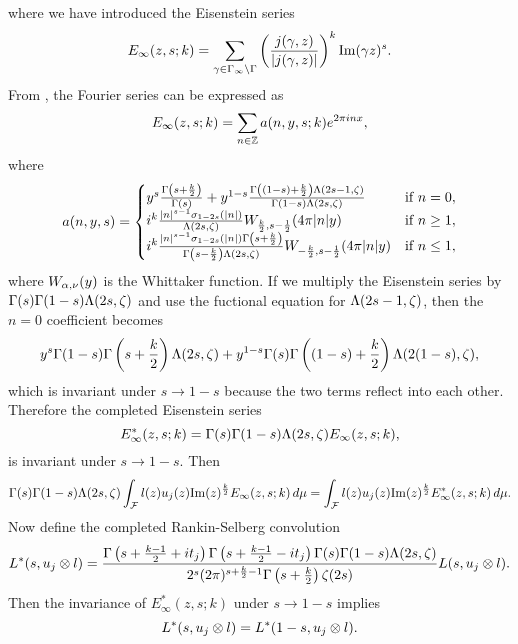 \documentclass[12pt,reqno,oneside]{amsart}
\begin{document}
  where we have introduced the Eisenstein series
  \[
    E_{\infty}(z,s;k) = \sum_{\gamma \in \Gamma_{\infty}\backslash\Gamma}\left(\frac{j(\gamma,z)}{|j(\gamma,z)|}\right)^{k}\mathrm{Im}(\gamma z)^{s}.
  \]
  From \cite{HDL}, the Fourier series can be expressed as
  \[
      E_{\infty}(z,s;k) = \sum_{n \in \mathbb{Z}}a(n,y,s;k)e^{2\pi inx},
  \]
  where
  \[
    a(n,y,s) = \begin{cases} y^{s}\frac{\Gamma\left(s+\frac{k}{2}\right)}{\Gamma(s)}+y^{1-s}\frac{\Gamma\left((1-s)+\frac{k}{2}\right)\Lambda(2s-1,\zeta)}{\Gamma(1-s)\Lambda(2s,\zeta)} & \text{if $n = 0$}, \\ i^{k}\frac{|n|^{s-1}\sigma_{1-2s}(|n|)}{\Lambda(2s,\zeta)}W_{\frac{k}{2},s-\frac{1}{2}}(4\pi|n|y) & \text{if $n \ge 1$}, \\ i^{k}\frac{|n|^{s-1}\sigma_{1-2s}(|n|)\Gamma\left(s+\frac{k}{2}\right)}{\Gamma\left(s-\frac{k}{2}\right)\Lambda(2s,\zeta)}W_{-\frac{k}{2},s-\frac{1}{2}}(4\pi|n|y) & \text{if $n \le 1$}, \end{cases}
  \]
  where $W_{\alpha,\nu}(y)$ is the Whittaker function. If we multiply the Eisenstein series by $\Gamma(s)\Gamma(1-s)\Lambda(2s,\zeta)$ and use the fuctional equation for $\Lambda(2s-1,\zeta)$, then the $n = 0$ coefficient becomes
  \[
    y^{s}\Gamma(1-s)\Gamma\left(s+\frac{k}{2}\right)\Lambda(2s,\zeta)+y^{1-s}\Gamma(s)\Gamma\left((1-s)+\frac{k}{2}\right)\Lambda(2(1-s),\zeta),
  \]
  which is invariant under $s \to 1-s$ because the two terms reflect into each other. Therefore the completed Eisenstein series
  \[
    E_{\infty}^{\ast}(z,s;k) = \Gamma(s)\Gamma(1-s)\Lambda(2s,\zeta)E_{\infty}(z,s;k),
  \]
  is invariant under $s \to 1-s$. Then
  \[
    \Gamma(s)\Gamma(1-s)\Lambda(2s,\zeta)\int_{\mathcal{F}}l(z)u_{j}(z)\mathrm{Im}(z)^{\frac{k}{2}}E_{\infty}(z,s;k)\,d\mu = \int_{\mathcal{F}}l(z)u_{j}(z)\mathrm{Im}(z)^{\frac{k}{2}}E_{\infty}^{\ast}(z,s;k)\,d\mu.
  \]
  Now define the completed Rankin-Selberg convolution
  \[
    L^{\ast}(s,u_{j} \otimes l) = \frac{\Gamma\left(s+\frac{k-1}{2}+it_{j}\right)\Gamma\left(s+\frac{k-1}{2}-it_{j}\right)\Gamma(s)\Gamma(1-s)\Lambda(2s,\zeta)}{2^{s}(2\pi)^{s+\frac{k}{2}-1}\Gamma\left(s+\frac{k}{2}\right)\zeta(2s)}L(s,u_{j} \otimes l).
  \]
  Then the invariance of $E_{\infty}^{\ast}(z,s;k)$ under $s \to 1-s$ implies
  \[
    L^{\ast}(s,u_{j} \otimes l) = L^{\ast}(1-s,u_{j} \otimes l).
  \]
  
\end{document}
